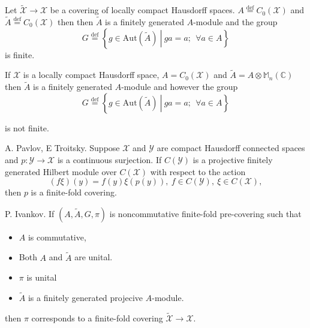 \documentclass{beamer}
\theoremstyle{plain}
\newcommand{\be}{\begin{equation}}
\newcommand{\ee}{\end{equation}}
\newcommand{\Aut}{\mathrm{Aut}}
\newcommand{\sX}{\mathcal{X}}       %
\newcommand{\bydef}{\stackrel{\mathrm{def}}{=}}
\begin{document}
\begin{frame}
\begin{example}
Let $\widetilde{\sX} \to \sX$ be a covering of locally compact Hausdorff spaces.
 $A \bydef C_0\left(\mathcal{X}\right)$ and $\widetilde{A}\bydef C_0\left(\mathcal{X}\right)$ then then $\widetilde{A}$ is a finitely generated $A$-module and the group
			\be\nonumber
G \bydef \left\{ \left.g \in \Aut\left(\widetilde{A} \right)~\right|~ ga = a;~~\forall a \in A\right\}
\ee
is finite.
\end{example}\begin{example}
If $\mathcal{X}$ is a locally compact Hausdorff space, $A = C_0\left(\mathcal{X}\right)$ and $\widetilde{A}= A\otimes \mathbb{M}_n\left(\mathbb{C} \right)$  then $\widetilde{A}$ is a finitely generated $A$-module and however the group
\be\nonumber
G \bydef \left\{ \left.g \in \Aut\left(\widetilde{A} \right)~\right|~ ga = a;~~\forall a \in A\right\}
\ee

is not finite.
\end{example}
\end{frame}
\begin{frame}

	\begin{theorem}\alert{A. Pavlov, E Troitsky}.
		Suppose $\mathcal X$ and $\mathcal Y$ are compact Hausdorff connected spaces and $p :\mathcal  Y \to \mathcal X$
is a continuous surjection. If $C(\mathcal Y )$ is a projective finitely generated Hilbert module over
$C(\mathcal X)$ with respect to the action
\begin{equation*}
(f\xi)(y) = f(y)\xi(p(y)), ~ f \in  C(\mathcal Y ), ~ \xi \in  C(\mathcal X),
\end{equation*}
then $p$ is a finite-fold  covering.
	\end{theorem}


\begin{corollary}\alert{P. Ivankov}.
	If $\left(A, \widetilde{A}, G, \pi \right)$ is noncommutative finite-fold  pre-covering such that
	\begin{itemize}
		\item $A$ is commutative,
		\item Both $A$ and $\widetilde{A}$ are unital.
		\item $\pi$ is unital 
	\item $\widetilde{A}$	is a finitely generated projecive $A$-module.
	\end{itemize}
	then $\pi$ corresponds to a finite-fold covering $ \widetilde{\mathcal  X}\to \mathcal  X$.
\end{corollary}
\end{frame}
\end{document}

